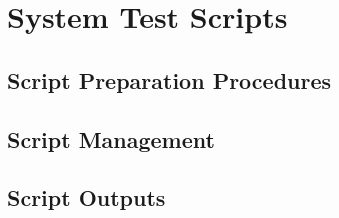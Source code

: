 \chapter{System Test Scripts}

\section{Script Preparation Procedures}

\section{Script Management}

\section{Script Outputs}